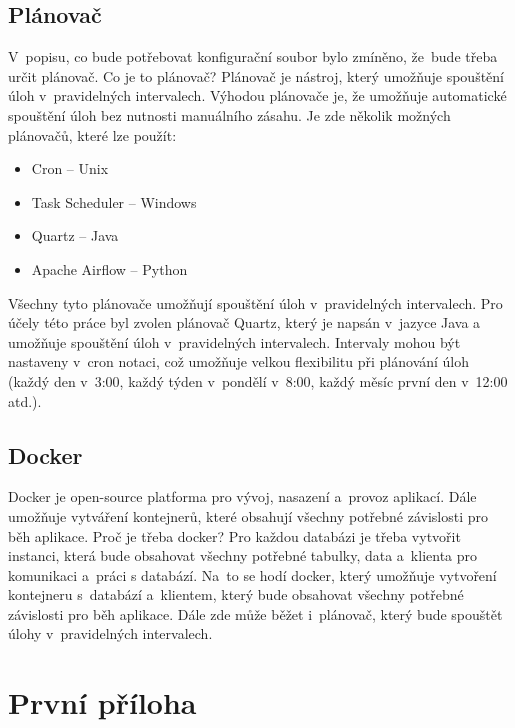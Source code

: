 \documentclass[czech, kiv, ba, he, iso690numb, pdf]{fasthesis}
\begin{document}
\newpage
\section{Plánovač}
V~popisu, co bude potřebovat konfigurační soubor bylo zmíněno, že~bude třeba určit plánovač.
Co je to plánovač?
Plánovač je nástroj, který umožňuje spouštění úloh v~pravidelných intervalech.
Výhodou plánovače je, že umožňuje automatické spouštění úloh bez nutnosti manuálního zásahu.
Je zde několik možných plánovačů, které lze použít:
\begin{itemize}
    \item Cron -- Unix
    \item Task Scheduler -- Windows
    \item Quartz -- Java
    \item Apache Airflow -- Python
\end{itemize}
Všechny tyto plánovače umožňují spouštění úloh v~pravidelných intervalech.
Pro účely této práce byl zvolen plánovač Quartz, který je napsán v~jazyce Java a 
umožňuje spouštění úloh v~pravidelných intervalech.
Intervaly mohou být nastaveny v~cron notaci, což umožňuje velkou flexibilitu při plánování úloh
(každý den v~3:00, každý týden v~pondělí v~8:00, každý měsíc první den v~12:00 atd.).

\section{Docker}
Docker je open-source platforma pro vývoj, nasazení a~provoz aplikací.
Dále umožňuje vytváření kontejnerů, které obsahují všechny potřebné závislosti pro běh aplikace.
Proč je třeba docker?
Pro každou databázi je třeba vytvořit instanci, která bude obsahovat všechny potřebné tabulky, data 
a~klienta pro komunikaci a~práci s databází. Na~to se hodí docker, který umožňuje vytvoření kontejneru s~databází
a~klientem, který bude obsahovat všechny potřebné závislosti pro běh aplikace.
Dále zde může běžet i~plánovač, který bude spouštět úlohy v~pravidelných intervalech.
\cite{docker}


\appendix
\chapter{První příloha}
\backmatter
\printbibliography
\setbackpageqrcode
\backpage
\end{document}
